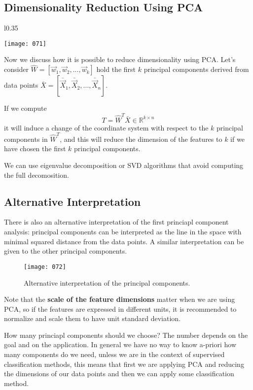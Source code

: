 \subsection{Dimensionality Reduction Using PCA}
\begin{wrapfigure}{l}{0.35\textwidth}
    \begin{center}
        \texttt{[image: 071]}
        \caption{}
    \end{center}
    \label{fig:071}
\end{wrapfigure}
Now we discuss how it is possible to reduce dimensionality using PCA. Let's consider \(\hat{W} = \left[\vec{w}_1, \vec{w}_2, ..., \vec{w}_k \right]\) hold the first \(k\) principal components derived from data points \(\bar{X} = \left[\bar{\vec{X}}_1, \bar{\vec{X}}_2, ..., \bar{\vec{X}}_n \right]\).

If we compute
\begin{equation}
    T = \hat{W}^T \bar{X} \in \mathbb{R}^{k \times n}
\end{equation}
it will induce a change of the coordinate system with respect to the \(k\) principal components in \(\hat{W}^T\), and this will reduce the dimension of the features to \(k\) if we have chosen the first \(k\) principal components.

We can use eigenvalue decomposition or SVD algorithms that avoid computing the full decomosition.

\subsection{Alternative Interpretation}
There is also an alternative interpretation of the first princiapl component analysis: principal components can be interpreted as the line in the space with minimal squared distance from the data points. A similar interpretation can be given to the other principal components.

\begin{figure}[h!]
    \centering
    \texttt{[image: 072]}
    \caption{Alternative interpretation of the principal components.}
    \label{fig:072}
\end{figure}

Note that the \textbf{scale of the feature dimensions} matter when we are using PCA, so if the features are expressed in different units, it is recommended to normalize and scale them to have unit standard deviation. 

How many princiapl components should we choose? The number depends on the goal and on the application. In general we have no way to know a-priori how many components do we need, unless we are in the context of supervised classification methods, this means that first we are applying PCA and reducing the dimensions of our data points and then we can apply some classification method.

